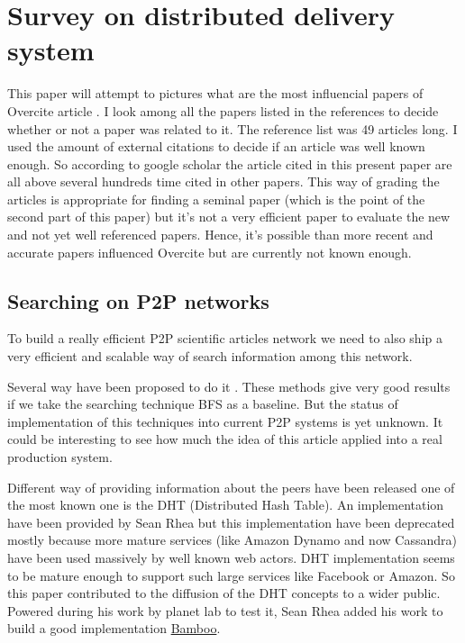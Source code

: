 \section{Survey on distributed delivery system}

This paper will attempt to pictures what are the most influencial papers of Overcite article
\cite{overcite}. I look among all the papers listed in the references to decide whether 
or not a paper was related to it. The reference list was 49 articles long. I used the 
amount of external citations to decide if an article was well known enough. So
according to google scholar the article cited in this present paper are all above several 
hundreds time cited in other papers. This way of grading the articles is appropriate 
for finding a seminal paper (which is the point of the second part of this paper) but 
it's not a very efficient paper to evaluate the new and not yet well referenced papers.
Hence, it's possible than more recent and accurate papers influenced Overcite but are 
currently not known enough.


\subsection{Searching on P2P networks}

To build a really efficient P2P scientific articles network we need to also
ship a very efficient and scalable way of search information among this network.

Several way have been proposed to do it \cite{Yang02improvingsearch}. These methods give
very good results if we take the searching technique BFS as a baseline. But the status of implementation
of this techniques into current P2P systems is yet unknown. It could be interesting to see how much 
the idea of this article applied into a real production system.

Different way of providing information about the peers have been released one of the most known one is
the DHT (Distributed Hash Table). An implementation have been provided by Sean Rhea \cite{Rhea:2005:OPD:1090191.1080102}
but this implementation have been deprecated mostly because more mature services (like Amazon Dynamo and now Cassandra)
have been used massively by well known web actors. DHT implementation seems to be mature enough to support such large
services like Facebook or Amazon. So this paper contributed to the diffusion of the DHT concepts to a wider public.
Powered during his work by planet lab to test it, Sean Rhea added 
his work to build a good implementation \href{bamboo-dht.org}{Bamboo}.

